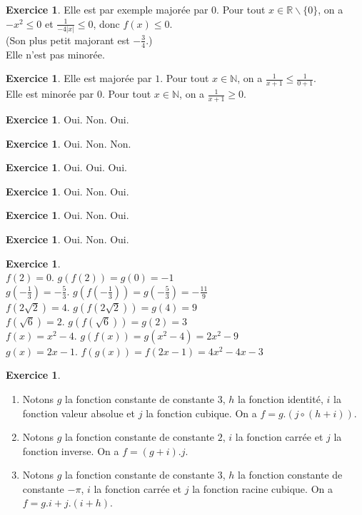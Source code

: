 \documentclass[a4paper,13pt]{scrreprt}
\theoremstyle{plain}
\theoremstyle{definition}
\newtheorem{exo}[subsection]{Exercice}
\newcommand{\nn}{\mathbb{N}}
\newcommand{\rr}{\mathbb{R}}
\begin{document}
\begin{exo} Elle est par exemple majorée par $0$. Pour tout $x \in {\rr} \backslash \{0\}$, on a $-x^2 \le 0$ et $\frac{1}{-4|x|} \le 0$, donc $f(x) \le 0$. \\
	(Son plus petit majorant est $-\frac{3}{4}$.) \\
	Elle n'est pas minorée.
\end{exo}

\begin{exo} Elle est majorée par $1$. Pour tout $x \in \nn$, on a $\frac{1}{x+1} \le \frac{1}{0+1}$. \\
	Elle est minorée par $0$. Pour tout $x \in \nn$, on a $\frac{1}{x+1} \ge 0$.
\end{exo}

\begin{exo} Oui. Non. Oui.
\end{exo}

\begin{exo} Oui. Non. Non. 
\end{exo}

\begin{exo} Oui. Oui. Oui.
\end{exo}

\begin{exo} Oui. Non. Oui.
\end{exo}

\begin{exo} Oui. Non. Oui.
\end{exo}

\begin{exo} Oui. Non. Oui.
\end{exo}

\begin{exo} ~~\\
	$f(2)=0$. $g(f(2))=g(0)=-1$ \\
	$g(-\frac{1}{3})=-\frac{5}{3}$. $g(f(-\frac{1}{3}))=g(-\frac{5}{3})=-\frac{11}{9}$ \\
	$f(2\sqrt{2})=4$. $g(f(2\sqrt{2}))=g(4)=9$ \\
	$f(\sqrt{6})=2$. $g(f(\sqrt{6}))=g(2)=3$ \\
	$f(x)=x^2 -4 $. $g(f(x))=g(x^2 -4)=2x^2 - 9$ \\
	$g(x)=2x-1$. $f(g(x))=f(2x-1)=4x^2-4x-3$
\end{exo}

\begin{exo}	~~\\
	\begin{enumerate}
		\item Notons $g$ la fonction constante de constante $3$, $h$ la fonction identité, $i$ la fonction valeur absolue et $j$ la fonction cubique. On a $f = g.(j\circ(h+i))$.
		\item 	Notons $g$ la fonction constante de constante $2$, $i$ la fonction carrée et $j$ la fonction inverse. On a $f = (g + i).j$.
		\item Notons $g$ la fonction constante de constante $3$, $h$ la fonction constante de constante $- \pi$, $i$ la fonction carrée et $j$ la fonction racine cubique. On a $f = g.i + j.(i + h)$.
	\end{enumerate}
\end{exo}
\end{document}
